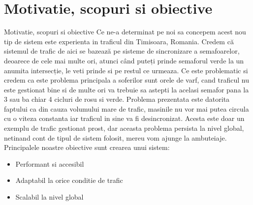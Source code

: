 \documentclass{beamer}
\begin{document}
\section{Motivatie, scopuri si obiective}
    \begin{frame}{Motivatie, scopuri si obiective}
        Ce ne-a determinat pe noi sa concepem acest nou tip de sistem este
        experienta in traficul din Timisoara, Romania. 
        Credem că sistemul de trafic de aici se bazează pe sisteme de sincronizare a semafoarelor,
        deoarece de cele mai multe ori, atunci când puteți prinde semaforul
        verde la un anumita intersecție, le veti prinde si pe restul ce urmeaza.
        Ce este problematic si credem ca este problema principala a soferilor 
        sunt orele de varf, cand traficul nu este gestionat bine si de 
        multe ori va trebuie sa astepti la acelasi semafor pana la 3 sau ba 
        chiar 4 cicluri de rosu si verde. Problema prezentata este datorita faptului 
        ca din cauza volumului mare de trafic, masinile nu vor mai putea circula 
        cu o viteza constanta iar traficul in sine va fi desincronizat.
        Acesta este doar un exemplu de trafic gestionat prost, dar 
        aceasta problema persista la nivel global, netinand cont de 
        tipul de sistem folosit, mereu vom ajunge la ambuteiaje. 
        Principalele noastre obiective sunt crearea unui sistem:

        \begin{itemize}[<+-| alert@+>]
            \item Performant si accesibil
            \item Adaptabil la orice conditie de trafic
            \item Scalabil la nivel global
            
        \end{itemize}

    \end{frame}
\end{document}
